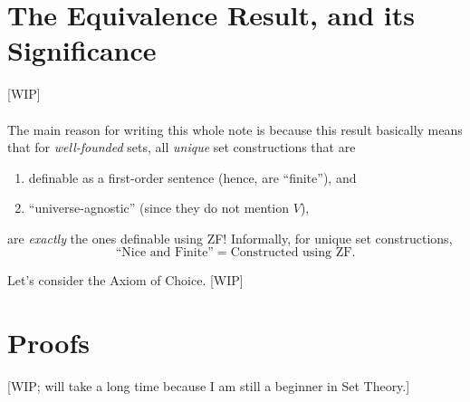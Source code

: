 \documentclass{article}
\begin{document}
\section{The Equivalence Result, and its Significance}
[WIP] \cite{levy} \cite{reinhardt}
\\\\
\noindent The main reason for writing this whole note is because this result basically means that for \textit{well-founded} sets, all \textit{unique} set constructions that are
\begin{enumerate}
	\item definable as a first-order sentence (hence, are ``finite''), and
	\item ``universe-agnostic'' (since they do not mention $V$),
\end{enumerate}
are \textit{exactly} the ones definable using ZF! Informally, for unique set constructions, $$\text{``Nice and Finite''} = \text{Constructed using ZF}.$$

Let's consider the Axiom of Choice. [WIP]
\section{Proofs}
[WIP; will take a long time because I am still a beginner in Set Theory.]



\end{document}
